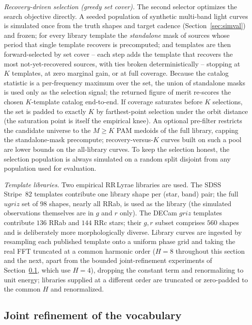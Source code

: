 \documentclass[apj]{emulateapj}
\begin{document}
\emph{Recovery-driven selection (greedy set cover).}
The second selector optimizes the search objective directly.  A seeded
population of synthetic multi-band light curves is simulated once from
the truth shapes and target cadence (Section~\ref{sec:simval}) and
frozen; for every library template the \emph{standalone} mask of sources
whose period that single template recovers is precomputed; and templates
are then forward-selected by set cover -- each step adds the template
that recovers the most not-yet-recovered sources, with ties broken
deterministically -- stopping at $K$ templates, at zero marginal gain, or
at full coverage.  Because the catalog statistic is a per-frequency
maximum over the set, the union of standalone masks is used only as the
selection signal; the returned figure of merit re-scores the chosen
$K$-template catalog end-to-end.  If coverage saturates before $K$
selections, the set is padded to exactly $K$ by farthest-point selection
under the orbit distance (the saturation point is itself the empirical
knee).  An optional pre-filter restricts the candidate universe to the
$M \geq K$ PAM medoids of the full library, capping the standalone-mask
precompute; recovery-versus-$K$ curves built on such a pool are lower
bounds on the all-library curves.  To keep the selection honest, the
selection population is always simulated on a random split disjoint from
any population used for evaluation.

\emph{Template libraries.}
Two empirical RR\,Lyrae libraries are used.  The \citet{Sesar_etal_2010}
SDSS Stripe~82 templates contribute one library shape per (star, band)
pair; the full $ugriz$ set of $98$ shapes, nearly all RRab, is used as
the library (the simulated observations themselves are in $g$ and $r$
only).
The \citet{Baeza-Villagra_etal_2025} DECam $griz$ templates contribute
$136$ RRab and $144$ RRc stars; their $g,r$ subset comprises $560$
shapes and is deliberately more morphologically diverse.  Library curves
are ingested by resampling each published template onto a uniform phase
grid and taking the real FFT truncated at a common harmonic order
($H = 8$ throughout this section and the next, apart from the bounded
joint-refinement experiments of Section~\ref{sec:vocab-joint}, which use
$H = 4$), dropping the constant
term and renormalizing to unit energy; libraries supplied at a different
order are truncated or zero-padded to the common $H$ and renormalized.

\subsection{Joint refinement of the vocabulary}
\label{sec:vocab-joint}
\end{document}
